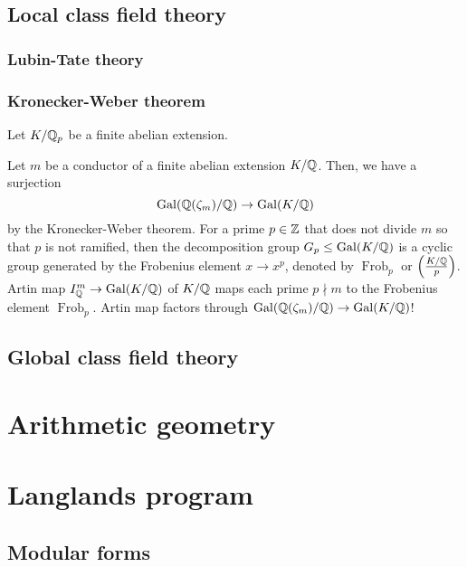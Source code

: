 \documentclass{../../large}
\DeclareMathOperator{\Frob}{Frob}
\begin{document}
\chapter{Local class field theory}
\section{Lubin-Tate theory}
\section{Kronecker-Weber theorem}
\begin{prb}
Let $K/\mathbb{Q}_p$ be a finite abelian extension.

\end{prb}







Let $m$ be a conductor of a finite abelian extension $K/\mathbb{Q}$.
Then, we have a surjection
\[\operatorname{Gal}(\mathbb{Q}(\zeta_m)/\mathbb{Q})\to\operatorname{Gal}(K/\mathbb{Q})\]
by the Kronecker-Weber theorem.
For a prime $p\in\mathbb{Z}$ that does not divide $m$ so that $p$ is not ramified, then the decomposition group $G_p\le\operatorname{Gal}(K/\mathbb{Q})$ is a cyclic group generated by the Frobenius element $x\to x^p$, denoted by $\Frob_p$ or $\left(\frac{K/\mathbb{Q}}p\right)$.
Artin map $I_{\mathbb{Q}}^m\to\operatorname{Gal}(K/\mathbb{Q})$ of $K/\mathbb{Q}$ maps each prime $p\nmid m$ to the Frobenius element $\Frob_p$.
Artin map factors through $\operatorname{Gal}(\mathbb{Q}(\zeta_m)/\mathbb{Q})\to\operatorname{Gal}(K/\mathbb{Q})$!


\chapter{Global class field theory}



\chapter{}




\part{Arithmetic geometry}

\part{Langlands program}
\chapter{Modular forms}
\end{document}
